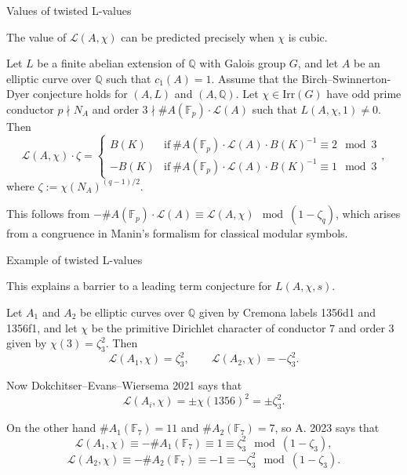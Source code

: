 \documentclass[10pt]{beamer}
\begin{document}
\begin{frame}[t]{Values of twisted L-values}

The value of $ \mathcal{L}(A, \chi) $ can be predicted precisely when $ \chi $ is cubic.

\pause

\begin{theorem}[A. 2023]
Let $ L $ be a finite abelian extension of $ \mathbb{Q} $ with Galois group $ G $, and let $ A $ be an elliptic curve over $ \mathbb{Q} $ such that $ c_1(A) = 1 $. Assume that the Birch--Swinnerton-Dyer conjecture holds for $ (A, L) $ and $ (A, \mathbb{Q}) $. Let $ \chi \in \mathrm{Irr}(G) $ have odd prime conductor $ p \nmid N_A $ and order $ 3 \nmid \#A(\mathbb{F}_p) \cdot \mathcal{L}(A) $ such that $ L(A, \chi, 1) \ne 0 $. \pause Then
$$ \mathcal{L}(A, \chi) \cdot \zeta = \begin{cases} B(K) & \text{if} \ \#A(\mathbb{F}_p) \cdot \mathcal{L}(A) \cdot B(K)^{-1} \equiv 2 \mod 3 \\ -B(K) & \text{if} \ \#A(\mathbb{F}_p) \cdot \mathcal{L}(A) \cdot B(K)^{-1} \equiv 1 \mod 3 \end{cases}, $$
where $ \zeta := \chi(N_A)^{(q - 1) / 2} $.
\end{theorem}

\pause

This follows from $ -\#A(\mathbb{F}_p) \cdot \mathcal{L}(A) \equiv \mathcal{L}(A, \chi) \mod (1 - \zeta_q) $, which arises from a congruence in Manin's formalism for classical modular symbols.

\end{frame}

\begin{frame}[t]{Example of twisted L-values}

This explains a barrier to a leading term conjecture for $ L(A, \chi, s) $.

\pause

\begin{example}
Let $ A_1 $ and $ A_2 $ be elliptic curves over $ \mathbb{Q} $ given by Cremona labels 1356d1 and 1356f1, and let $ \chi $ be the primitive Dirichlet character of conductor $ 7 $ and order $ 3 $ given by $ \chi(3) = \zeta_3^2 $. Then
$$ \mathcal{L}(A_1, \chi) = \zeta_3^2, \qquad \mathcal{L}(A_2, \chi) = -\zeta_3^2. $$

\pause

Now Dokchitser--Evans--Wiersema 2021 says that
$$ \mathcal{L}(A_i, \chi) = \pm\chi(1356)^2 = \pm\zeta_3^2. $$

\pause

On the other hand $ \#A_1(\mathbb{F}_7) = 11 $ and $ \#A_2(\mathbb{F}_7) = 7 $, so A. 2023 says that
$$ \mathcal{L}(A_1, \chi) \equiv -\#A_1(\mathbb{F}_7) \equiv 1 \equiv \zeta_3^2 \mod (1 - \zeta_3), $$
$$ \mathcal{L}(A_2, \chi) \equiv -\#A_2(\mathbb{F}_7) \equiv -1 \equiv -\zeta_3^2 \mod (1 - \zeta_3). $$
\end{example}

\end{frame}
\end{document}
